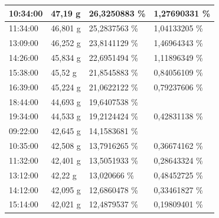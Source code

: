 \begin{table}[]
\begin{tabular}{llll}
		\multicolumn{1}{|l|}{10:34:00} & \multicolumn{1}{l|}{47,19 g} & \multicolumn{1}{l|}{26,3250883   \%} & \multicolumn{1}{l|}{1,27690331 \%} \\ \hline
		\multicolumn{1}{|l|}{11:34:00} & \multicolumn{1}{l|}{46,801 g} & \multicolumn{1}{l|}{25,2837563   \%} & \multicolumn{1}{l|}{1,04133205 \%} \\ \hline
		\multicolumn{1}{|l|}{13:09:00} & \multicolumn{1}{l|}{46,252 g} & \multicolumn{1}{l|}{23,8141129   \%} & \multicolumn{1}{l|}{1,46964343 \%} \\ \hline
		\multicolumn{1}{|l|}{14:26:00} & \multicolumn{1}{l|}{45,834 g} & \multicolumn{1}{l|}{22,6951494   \%} & \multicolumn{1}{l|}{1,11896349 \%} \\ \hline
		\multicolumn{1}{|l|}{15:38:00} & \multicolumn{1}{l|}{45,52 g} & \multicolumn{1}{l|}{21,8545883   \%} & \multicolumn{1}{l|}{0,84056109 \%} \\ \hline
		\multicolumn{1}{|l|}{16:39:00} & \multicolumn{1}{l|}{45,224 g} & \multicolumn{1}{l|}{\cellcolor[HTML]{00B0F0}21,0622122   \%} & \multicolumn{1}{l|}{0,79237606 \%} \\ \hline
		\multicolumn{1}{|l|}{18:44:00} & \multicolumn{1}{l|}{44,693 g} & \multicolumn{1}{l|}{\cellcolor[HTML]{00B0F0}19,6407538   \%} &  \\ \hline
		\multicolumn{1}{|l|}{19:34:00} & \multicolumn{1}{l|}{44,533 g} & \multicolumn{1}{l|}{19,2124424   \%} & \multicolumn{1}{l|}{0,42831138 \%} \\ \hline
		\multicolumn{1}{|l|}{09:22:00} & \multicolumn{1}{l|}{42,645 g} & \multicolumn{1}{l|}{14,1583681   \%} &  \\ \hline
		\multicolumn{1}{|l|}{10:35:00} & \multicolumn{1}{l|}{42,508 g} & \multicolumn{1}{l|}{13,7916265   \%} & \multicolumn{1}{l|}{0,36674162 \%} \\ \hline
		\multicolumn{1}{|l|}{11:32:00} & \multicolumn{1}{l|}{42,401 g} & \multicolumn{1}{l|}{13,5051933   \%} & \multicolumn{1}{l|}{0,28643324 \%} \\ \hline
		\multicolumn{1}{|l|}{13:12:00} & \multicolumn{1}{l|}{42,22 g} & \multicolumn{1}{l|}{13,020666   \%} & \multicolumn{1}{l|}{0,48452725 \%} \\ \hline
		\multicolumn{1}{|l|}{14:12:00} & \multicolumn{1}{l|}{42,095 g} & \multicolumn{1}{l|}{12,6860478   \%} & \multicolumn{1}{l|}{0,33461827 \%} \\ \hline
		\multicolumn{1}{|l|}{15:14:00} & \multicolumn{1}{l|}{42,021 g} & \multicolumn{1}{l|}{12,4879537   \%} & \multicolumn{1}{l|}{0,19809401 \%} \\ \hline

\end{tabular}
\end{table}
